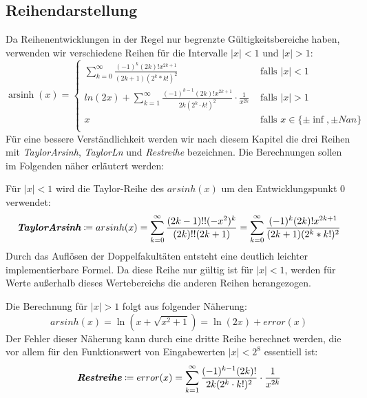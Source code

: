 \documentclass[course=erap] {aspdoc}
\begin{document}
    \subsection{Reihendarstellung}
    Da Reihenentwicklungen in der Regel nur begrenzte Gültigkeitsbereiche haben, verwenden wir verschiedene Reihen für die Intervalle $|x| < 1$ und $|x| > 1$: 
      \[ \operatorname{arsinh}(x) =
    \begin{cases}
        \sum_{k = 0}^{\infty} \frac{(-1)^k(2k)!x^{2k + 1}}{(2k + 1)(2^k*k!)^2}     & \text{ falls } |x| < 1 \\
        ln(2x) + \sum_{k = 1}^{\infty} \frac{(-1)^{k - 1}(2k)!x^{2k + 1}}{2k(2^k\cdot k!)^2} \cdot \frac{1}{x^{2k}}  & \text{ falls } |x| >1 \\
        x     & \text{ falls } x \in \{\pm\inf, \pm Nan\}\\
    \end{cases}\]
    Für eine bessere Verständlichkeit werden wir nach diesem Kapitel die drei Reihen mit \textit{TaylorArsinh}, \textit{TaylorLn} und \textit{Restreihe} bezeichnen.
    Die Berechnungen sollen im Folgenden näher erläutert werden:
    
    Für $|x| < 1$ wird die Taylor-Reihe des $arsinh(x)$ um den Entwicklungspunkt 0 verwendet:
    \[
       \textit{\textbf{TaylorArsinh}}\coloneqq arsinh(x) = \sum_{k = 0}^{\infty} \frac{(2k-1)!!(-x^2)^k}{(2k)!!(2k + 1)}
        = \sum_{k = 0}^{\infty} \frac{(-1)^k(2k)!x^{2k + 1}}{(2k + 1)(2^k*k!)^2}
    \]
    Durch das Auflösen der Doppelfakultäten entsteht eine deutlich leichter implementierbare Formel.
    Da diese Reihe nur gültig ist für $|x| < 1$, werden für Werte außerhalb dieses Wertebereichs die anderen Reihen herangezogen.

    Die Berechnung für $|x| > 1$ folgt aus folgender Näherung:
    \[
        arsinh(x) = \ln(x + \sqrt{x^2 + 1}) = \ln(2x) + error(x)
    \]
    Der Fehler dieser Näherung kann durch eine dritte Reihe berechnet werden, die vor allem für den Funktionswert von Eingabewerten $|x| < 2^{8}$ essentiell ist:
    \[
        \textit{\textbf{Restreihe}}\coloneqq error(x) =  \sum_{k = 1}^{\infty} \frac{(-1)^{k - 1}(2k)!}{2k(2^k\cdot k!)^2} \cdot \frac{1}{x^{2k}}
    \]
    
\end{document}

